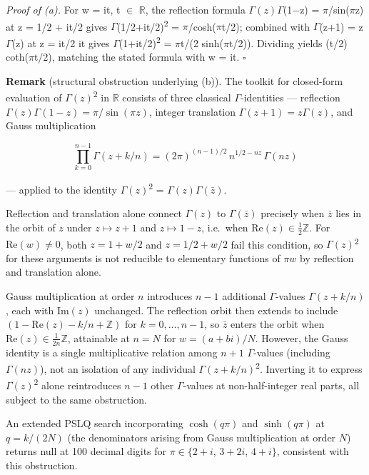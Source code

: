 \documentclass[11pt]{article}
\begin{document}
\emph{Proof of (a).} For w = it, t \(\in\) \(\mathbb{R}\), the
reflection formula \(\Gamma(z)\Gamma\)(1−z) = \(\pi\)/sin(\(\pi\)z) at z
= 1/2 + it/2 gives
\textbar{}\(\Gamma\)(1/2+it/2)\textbar{}\textsuperscript{2} =
\(\pi\)/cosh(\(\pi\)t/2); combined with \(\Gamma\)(z+1) = z\(\Gamma\)(z)
at z = it/2 it gives
\textbar{}\(\Gamma\)(1+it/2)\textbar{}\textsuperscript{2} = \(\pi\)t/(2
sinh(\(\pi\)t/2)). Dividing yields (t/2) coth(\(\pi\)t/2), matching the
stated formula with w = it. \(\square\)

\textbf{Remark} (structural obstruction underlying (b)). The toolkit for closed-form evaluation of \textbar{}\(\Gamma(z)\)\textbar{}\textsuperscript{2} in \(\mathbb{R}\) consists of three classical \(\Gamma\)-identities --- reflection \(\Gamma(z)\Gamma(1-z) = \pi/\sin(\pi z)\), integer translation \(\Gamma(z+1) = z\Gamma(z)\), and Gauss multiplication

\[\prod_{k=0}^{n-1} \Gamma(z + k/n) = (2\pi)^{(n-1)/2}\, n^{1/2 - nz}\, \Gamma(nz)\]

--- applied to the identity \textbar{}\(\Gamma(z)\)\textbar{}\textsuperscript{2} = \(\Gamma(z)\Gamma(\bar{z})\).

Reflection and translation alone connect \(\Gamma(z)\) to \(\Gamma(\bar{z})\)
precisely when \(\bar{z}\) lies in the orbit of \(z\) under \(z \mapsto z+1\) and
\(z \mapsto 1-z\), i.e.\ when \(\mathrm{Re}(z) \in \tfrac{1}{2}\mathbb{Z}\).
For \(\mathrm{Re}(w) \neq 0\), both \(z = 1+w/2\) and \(z = 1/2+w/2\) fail this
condition, so \textbar{}\(\Gamma(z)\)\textbar{}\textsuperscript{2} for
these arguments is not reducible to elementary functions of \(\pi w\)
by reflection and translation alone.

Gauss multiplication at order \(n\) introduces \(n-1\) additional
\(\Gamma\)-values \(\Gamma(z+k/n)\), each with \(\mathrm{Im}(z)\) unchanged. The
reflection orbit then extends to include
\((1-\mathrm{Re}(z)-k/n + \mathbb{Z})\) for \(k=0,\ldots,n-1\), so \(\bar{z}\)
enters the orbit when \(\mathrm{Re}(z) \in \tfrac{1}{2n}\mathbb{Z}\), attainable
at \(n=N\) for \(w = (a+bi)/N\). However, the Gauss identity is a single
multiplicative relation among \(n+1\) \(\Gamma\)-values (including
\(\Gamma(nz)\)), not an isolation of any individual
\textbar{}\(\Gamma(z+k/n)\)\textbar{}\textsuperscript{2}. Inverting it
to express \textbar{}\(\Gamma(z)\)\textbar{}\textsuperscript{2} alone
reintroduces \(n-1\) other \(\Gamma\)-values at non-half-integer real
parts, all subject to the same obstruction.

An extended PSLQ search incorporating \(\cosh(q\pi)\) and
\(\sinh(q\pi)\) at \(q = k/(2N)\) (the denominators arising from Gauss
multiplication at order \(N\)) returns null at 100 decimal digits for
\(\pi \in \{2+i,\, 3+2i,\, 4+i\}\), consistent with this obstruction.
\end{document}
